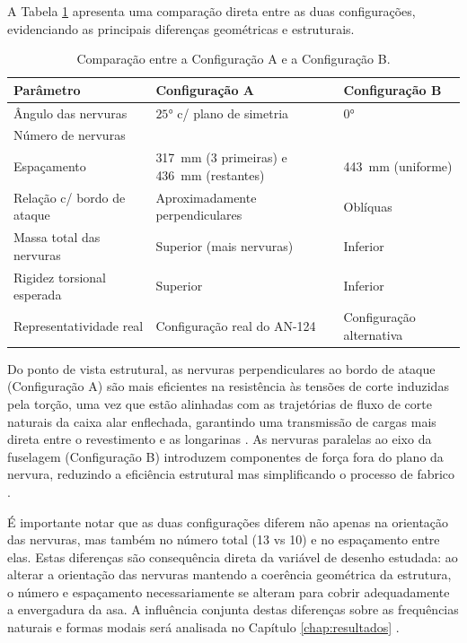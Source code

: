 \documentclass[11pt,oneside,a4paper,final]{report}
\begin{document}
A Tabela \ref{tab:comparacao_configs} apresenta uma comparação direta entre as duas configurações, evidenciando as principais diferenças geométricas e estruturais.

\begin{table}[H]
\centering
\caption{Comparação entre a Configuração A e a Configuração B.}
\label{tab:comparacao_configs}
\renewcommand{\arraystretch}{1.4}
\begin{tabularx}{\textwidth}{l >{\raggedright\arraybackslash}X >{\raggedright\arraybackslash}X}
\toprule
\textbf{Parâmetro} & \textbf{Configuração A} & \textbf{Configuração B} \\
\midrule
Ângulo das nervuras & $\ang{25}$ c/ plano de simetria & $\ang{0}$ \\
Número de nervuras & 13 & 10 \\
Espaçamento & \SI{317}{\milli\meter} (3 primeiras) e \SI{436}{\milli\meter} (restantes) & \SI{443}{\milli\meter} (uniforme) \\
Relação c/ bordo de ataque & Aproximadamente perpendiculares & Oblíquas \\
Massa total das nervuras & Superior (mais nervuras) & Inferior \\
Rigidez torsional esperada & Superior & Inferior \\
Representatividade real & Configuração real do AN-124 & Configuração alternativa \\
\bottomrule
\end{tabularx}
\end{table}

Do ponto de vista estrutural, as nervuras perpendiculares ao bordo de ataque (Configuração A) são mais eficientes na resistência às tensões de corte induzidas pela torção, uma vez que estão alinhadas com as trajetórias de fluxo de corte naturais da caixa alar enflechada, garantindo uma transmissão de cargas mais direta entre o revestimento e as longarinas \cite{Niu1988, Megson2012}. As nervuras paralelas ao eixo da fuselagem (Configuração B) introduzem componentes de força fora do plano da nervura, reduzindo a eficiência estrutural mas simplificando o processo de fabrico \cite{Raymer2018}.

É importante notar que as duas configurações diferem não apenas na orientação das nervuras, mas também no número total (13 vs 10) e no espaçamento entre elas. Estas diferenças são consequência direta da variável de desenho estudada: ao alterar a orientação das nervuras mantendo a coerência geométrica da estrutura, o número e espaçamento necessariamente se alteram para cobrir adequadamente a envergadura da asa. A influência conjunta destas diferenças sobre as frequências naturais e formas modais será analisada no Capítulo \ref{chap:resultados} \cite{Wright2015, Dowell2004}.
\end{document}
